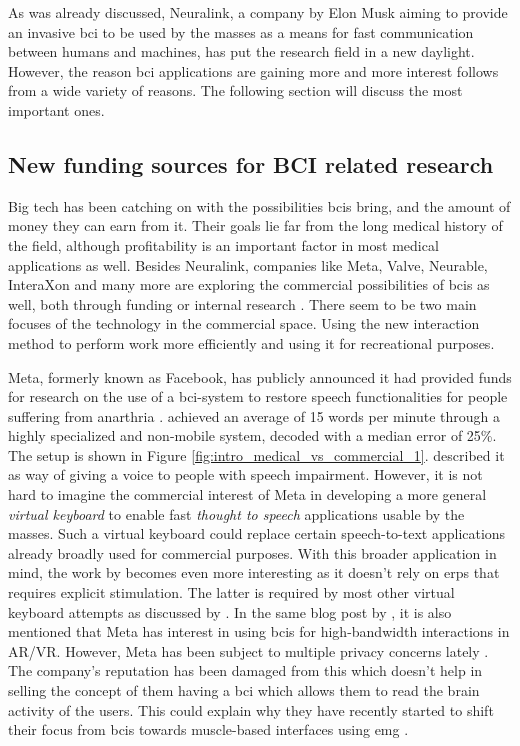 As was already discussed, Neuralink, a company by Elon Musk aiming to provide an invasive \gls{bci} to be used by the masses as a means for fast communication between humans and machines, has put the research field in a new daylight.
However, the reason \gls{bci} applications are gaining more and more interest follows from a wide variety of reasons.
The following section will discuss the most important ones.


\subsection{New funding sources for BCI related research}
\label{subsec:bci_gaining_popularity_big_tech}
Big tech has been catching on with the possibilities \glspl{bci} bring, and the amount of money they can earn from it.
Their goals lie far from the long medical history of the field, although profitability is an important factor in most medical applications as well.
Besides Neuralink, companies like Meta, Valve, Neurable, InteraXon and many more are exploring the commercial possibilities of \glspl{bci} as well, both through funding or internal research \citep{facebook_bci_keyboard, valve_bci_interest, neurable_white_paper, interaxon_tests}.
There seem to be two main focuses of the technology in the commercial space.
Using the new interaction method to perform work more efficiently and using it for recreational purposes.

Meta, formerly known as Facebook, has publicly announced it had provided funds for research on the use of a \gls{bci}-system to restore speech functionalities for people suffering from anarthria \citep{facebook_bci_keyboard, facebook_bci_blog}.
 achieved an average of 15 words per minute through a highly specialized and non-mobile system, decoded with a median error of 25\%.
The setup is shown in Figure \ref{fig:intro_medical_vs_commercial_1}.
 described it as way of giving a voice to people with speech impairment.
However, it is not hard to imagine the commercial interest of Meta in developing a more general \textit{virtual keyboard} to enable fast \textit{thought to speech} applications usable by the masses.
Such a virtual keyboard could replace certain speech-to-text applications already broadly used for commercial purposes.
With this broader application in mind, the work by \citet{facebook_bci_keyboard} becomes even more interesting as it doesn't rely on \glspl{erp} that requires explicit stimulation.
The latter is required by most other virtual keyboard attempts as discussed by \citet{bci_keyboard}.
In the same blog post by \citet{facebook_bci_blog}, it is also mentioned that Meta has interest in using \glspl{bci} for high-bandwidth interactions in AR/VR.
However, Meta has been subject to multiple privacy concerns lately \citep{facebook_drama1, facebook_drama2}.
The company's reputation has been damaged from this which doesn't help in selling the concept of them having a \gls{bci} which allows them to read the brain activity of the users.
This could explain why they have recently started to shift their focus from \glspl{bci} towards muscle-based interfaces using \gls{emg} \citep{facebook_bci_blog}.

